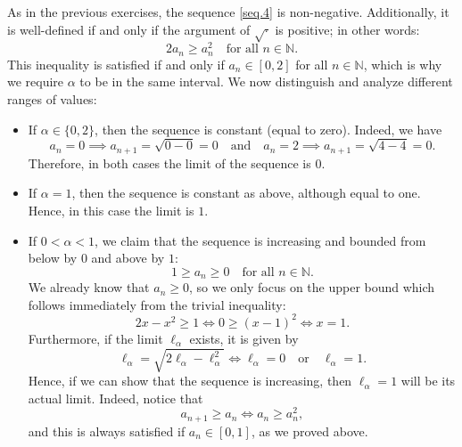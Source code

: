 \documentclass[a4paper,10 pt]{report}
\theoremstyle{definition}
\newcommand{\N}{\mathbb N}
\begin{document}
\begin{solutionBox} As in the previous exercises, the sequence \eqref{seq.4} is non-negative. Additionally, it is well-defined if and only if the argument of $\sqrt{\cdot}$ is positive; in other words:
\begin{equation*} 2 a_n \geq a_n^2 \quad \text{for all $n \in \N$}. \end{equation*}
This inequality is satisfied if and only if $a_n \in [0, 2]$ for all $n \in \N$, which is why we require $\alpha$ to be in the same interval. We now distinguish and analyze different ranges of values:

\begin{itemize}
	\item If $\alpha \in \{0,2\}$, then the sequence is constant (equal to zero). Indeed, we have
\begin{equation*} a_{n} = 0 \implies a_{n + 1} = \sqrt{0 - 0} = 0 \quad \text{and} \quad a_n = 2 \implies a_{n + 1} = \sqrt{4 - 4} = 0. \end{equation*}
Therefore, in both cases the limit of the sequence is $0$.

\item If $\alpha = 1$, then the sequence is constant as above, although equal to one. Hence, in this case the limit is $1$.

\item If $0 < \alpha < 1$, we claim that the sequence is increasing and bounded from below by $0$ and above by $1$:
\begin{equation*}1 \geq a_n \geq 0 \quad \text{for all $n \in \N$}. \end{equation*}
We already know that $a_n \ge 0$, so we only focus on the upper bound which follows immediately from the trivial inequality:
\begin{equation*} 2 x - x^2 \geq 1 \iff 0 \geq (x - 1)^2 \iff x = 1. \end{equation*}
Furthermore, if the limit $\ell_\alpha$ exists, it is given by
\begin{equation*}\ell_\alpha = \sqrt{2 \ell_\alpha - \ell_\alpha^2} \iff \ell_\alpha = 0 \quad \text{or} \quad \ell_\alpha = 1. \end{equation*}
Hence, if we can show that the sequence is increasing, then $\ell_\alpha = 1$ will be its actual limit. Indeed, notice that
\begin{equation*}a_{n + 1} \geq a_n \iff a_n \geq a_n^2,\end{equation*}
and this is always satisfied if $a_n \in [0, 1]$, as we proved above.


\end{itemize}
\end{solutionBox}
\end{document}
